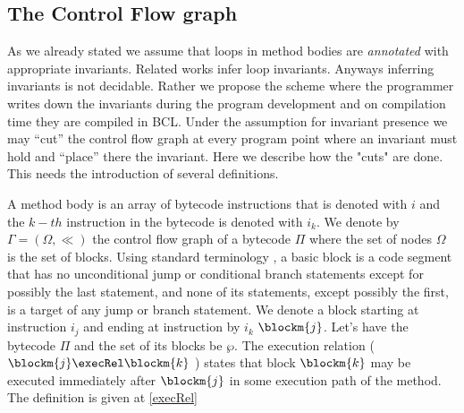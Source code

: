 
\subsection{The Control Flow graph}\label{abstrCntrFlow}
As we  already stated we assume that loops in method bodies are  \textit{annotated} with appropriate invariants. 
Related works \cite{WildmoserN-ESOP05} infer loop invariants. Anyways inferring invariants is not decidable. 
Rather we propose the scheme where the programmer writes down the invariants  during the program development  
and on compilation time they are compiled in BCL. 
Under the assumption for invariant presence we may ``cut'' the control flow graph at every program point
where an invariant must hold and ``place'' there the invariant. Here we describe how the "cuts" are done. This needs the introduction
of several definitions.
     
 A method body is an array of bytecode instructions that is denoted with $i$ and the $k-th$ instruction
 in the bytecode is  denoted with $i_{k}$.
 We denote by $\Gamma  = ( \Omega, \ll)$ the control flow graph of a
bytecode $\Pi$ where the set of nodes $\Omega$ is the set of
blocks. Using standard terminology \cite{ARUCom1986}, a
basic block is a code segment that has no unconditional jump or
conditional branch statements except for possibly the last
statement, and none of its statements, except possibly the first,
is a target of any jump or branch statement. 
 We denote a block starting at instruction  $i_{j}$  and ending at instruction by $i_{k}$ $\blockm{j}$. Let's have 
the bytecode $\Pi$ and the set of its blocks  be $\wp$. The execution relation ( $\blockm{j} \execRel \blockm{k}$ ) states that block
$ \blockm{k}$ may be executed immediately after $\blockm{j}$ in some execution path of the method. 
The  definition is given at \ref{execRel}

